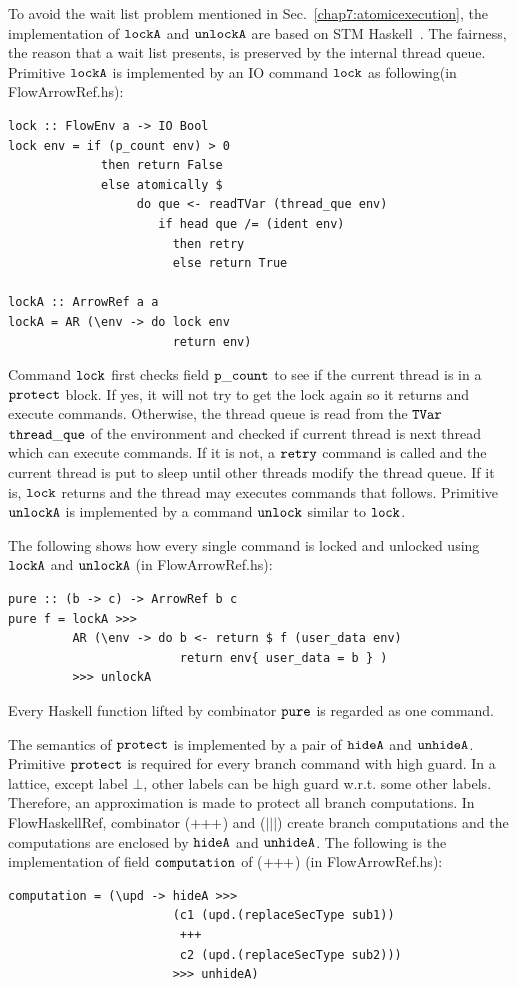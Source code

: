 \documentclass{report}
\newcommand{\arrowop}[1]{$#1\negthickspace #1\negthickspace #1$}
\newcommand{\co}[1]{$\cod{#1}$}
\begin{document}
To avoid the wait list problem mentioned in Sec.~\ref{chap7:atomicexecution}, the implementation of
\co{lockA} and \co{unlockA} are based on STM Haskell~\cite{Harris:Marlow:Jones:Herlihy:PPoPP05}. 
The fairness, the reason that a wait list presents, is preserved by the internal thread queue.
Primitive \co{lockA} is implemented by an IO command \co{lock} as following(in FlowArrowRef.hs):
\begin{Verbatim}[fontsize=\small]
lock :: FlowEnv a -> IO Bool
lock env = if (p_count env) > 0
             then return False
             else atomically $
                  do que <- readTVar (thread_que env)
                     if head que /= (ident env)
                       then retry
                       else return True

lockA :: ArrowRef a a
lockA = AR (\env -> do lock env
                       return env)
\end{Verbatim}
Command \co{lock} first checks field \co{p\_count} to see if the current thread is in a \co{protect} block.
If yes, it will not try to get the lock again so it returns and execute commands.
Otherwise, the thread queue is read from the \co{TVar} \co{thread\_que} of the environment and checked if 
current thread is next thread which can execute commands. If it is not, a \co{retry} command is called
and the current thread is put to sleep until other threads modify the thread queue. If it is, \co{lock}
returns and the thread may executes commands that follows. Primitive \co{unlockA} is implemented by a
command \co{unlock} similar to \co{lock}.

The following shows how every single command is locked and unlocked using \co{lockA} and \co{unlockA}
(in FlowArrowRef.hs):
\begin{Verbatim}[fontsize=\small]
pure :: (b -> c) -> ArrowRef b c
pure f = lockA >>>
         AR (\env -> do b <- return $ f (user_data env)
                        return env{ user_data = b } )
         >>> unlockA
\end{Verbatim}
Every Haskell function lifted by combinator \co{pure} is regarded as one command.

The semantics of \co{protect} is implemented by a pair of \co{hideA} and \co{unhideA}.
Primitive \co{protect} is required for every branch command with high guard. In a lattice,
except label $\bot$, other labels can be high guard w.r.t. some other labels. Therefore,
an approximation is made to protect all branch computations. In FlowHaskellRef, combinator
(\arrowop{+}) and ($|||$) create branch computations and the computations are enclosed by \co{hideA} and 
\co{unhideA}. The following is the implementation of field \co{computation} of (\arrowop{+})
(in FlowArrowRef.hs):
\begin{Verbatim}[fontsize=\small]
computation = (\upd -> hideA >>> 
                       (c1 (upd.(replaceSecType sub1)) 
                        +++ 
                        c2 (upd.(replaceSecType sub2))) 
                       >>> unhideA)
\end{Verbatim}
\end{document}
